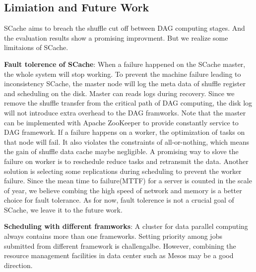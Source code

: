 \subsection{Limiation and Future Work}
SCache aims to breach the shuffle cut off between DAG computing stages. And the evaluation results show a promising improvment. But we realize some limitaions of SCache.

\textbf{Fault tolerence of SCache}: When a failure happened on the SCache master, the whole system will stop working. To prevent the machine failure leading to inconsistency SCache, the master node will log the meta data of shuffle register and scheduling on the disk. Master can reads logs during recovery. Since we remove the shuffle transfer from the critical path of DAG computing, the disk log will not introduce extra overhead to the DAG framworks. Note that the master can be implemented with Apache ZooKeeper\cite{zookeeper} to provide constantly service to DAG framework. If a failure happens on a worker, the optimization of tasks on that node will fail. It also violates the constraints of all-or-nothing, which means the gain of shuffle data cache maybe negligible. A promising way to slove the failure on worker is to reschedule reduce tasks and retransmit the data. Another solution is selecting some replications during scheduling to prevent the worker failure. Since the mean time to failure(MTTF) for a server is counted in the scale of year\cite{tachyon}, we believe combing the high speed of network and memory is a better choice for fault tolerance.  As for now, fault tolerence is not a crucial goal of SCache,  we leave it to the future work.  

\textbf{Scheduling with different framworks}: A cluster for data parallel computing always contains more than one frameworks. Setting priority among jobs submitted from different framework is challengalbe. However, combining the resource management facilities in data center such as Mesos\cite{mesos} may be a good direction.